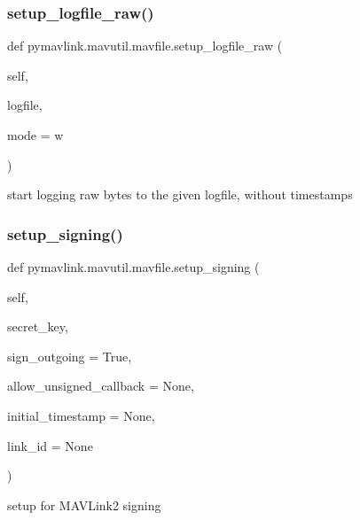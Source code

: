 \subsubsection{\texorpdfstring{setup\+\_\+logfile\+\_\+raw()}{setup\_logfile\_raw()}}
{\footnotesize\ttfamily def pymavlink.\+mavutil.\+mavfile.\+setup\+\_\+logfile\+\_\+raw (\begin{DoxyParamCaption}\item[{}]{self,  }\item[{}]{logfile,  }\item[{}]{mode = {\ttfamily \textquotesingle{}w\textquotesingle{}} }\end{DoxyParamCaption})}

\begin{DoxyVerb}start logging raw bytes to the given logfile, without timestamps\end{DoxyVerb}
 \mbox{\label{classpymavlink_1_1mavutil_1_1mavfile_a0ba591be56a6a76483d5a7480512406b}} 
\subsubsection{\texorpdfstring{setup\+\_\+signing()}{setup\_signing()}}
{\footnotesize\ttfamily def pymavlink.\+mavutil.\+mavfile.\+setup\+\_\+signing (\begin{DoxyParamCaption}\item[{}]{self,  }\item[{}]{secret\+\_\+key,  }\item[{}]{sign\+\_\+outgoing = {\ttfamily True},  }\item[{}]{allow\+\_\+unsigned\+\_\+callback = {\ttfamily None},  }\item[{}]{initial\+\_\+timestamp = {\ttfamily None},  }\item[{}]{link\+\_\+id = {\ttfamily None} }\end{DoxyParamCaption})}

\begin{DoxyVerb}setup for MAVLink2 signing\end{DoxyVerb}
 \mbox{\label{classpymavlink_1_1mavutil_1_1mavfile_a7749c322285d3e6c03f20b9f5931a9ba}} 
